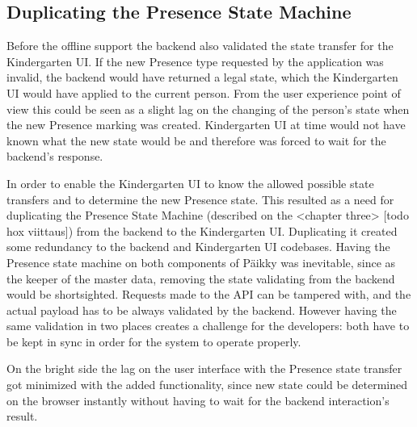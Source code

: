 




\subsection{Duplicating the Presence State Machine}

Before the offline support the backend also validated the state transfer for the Kindergarten UI. If the new Presence type requested by the application was invalid, the backend would have returned a legal state, which the Kindergarten UI would have applied to the current person. From the user experience point of view this could be seen as a slight lag on the changing of the person's state when the new Presence marking was created. Kindergarten UI at time would not have known what the new state would be and therefore was forced to wait for the backend's response. 


In order to enable the Kindergarten UI to know the allowed possible state transfers and to determine the new Presence state. This resulted as a need for duplicating the Presence State Machine (described on the <chapter three> [todo hox viittaus]) from the backend to the Kindergarten UI. Duplicating it created some redundancy to the backend and Kindergarten UI codebases. Having the Presence state machine on both components of Päikky was inevitable, since as the keeper of the master data, removing the state validating from the backend would be shortsighted. Requests made to the API can be tampered with, and the actual payload has to be always validated by the backend. However having the same validation in two places creates a challenge for the developers: both have to be kept in sync in order for the system to operate properly. 

On the bright side the lag on the user interface with the Presence state transfer got minimized with the added functionality, since new state could be determined on the browser instantly without having to wait for the backend interaction's result.




















